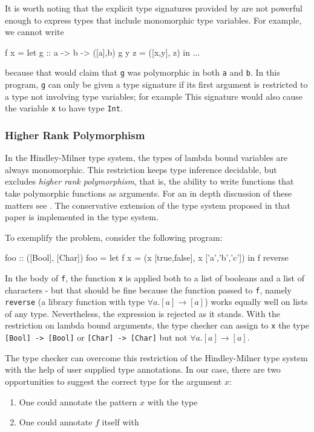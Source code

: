 It is worth noting that the explicit type signatures provided by \frege{} are not powerful enough to express types that include monomorphic type variables.
For example, we cannot write
\begin{code}
    f x = let
            g :: a -> b -> ([a],b)
            g y z = ([x,y], z)
        in ...
\end{code}
because that would claim that \texttt{g} was polymorphic in both \texttt{a} and \texttt{b}. In this program, \texttt{g} can only be given a type signature if its first argument is restricted to a type not involving type variables; for example 
This signature would also cause the variable \texttt{x} to have type \texttt{Int}.

\subsubsection{Higher Rank Polymorphism} \label{higher-rank}

In the Hindley-Milner type system, the types of lambda bound variables are always monomorphic. This restriction keeps type inference decidable, but excludes \emph{higher rank polymorphism}, that is, the ability to write functions that take polymorphic functions as arguments. For an in depth discussion of these matters see \cite{ptifart}. The conservative extension of the type system proposed in that paper is  implemented in the \frege{} type system.

To exemplify the problem, consider the following program:

\begin{code}
foo :: ([Bool], [Char])
foo = let
        f x = (x [true,false], x ['a','b','c'])
    in f reverse
\end{code}

In the body of \texttt{f}, the function \texttt{x} is applied both to a list of booleans and a list of characters - but that should be fine because the function passed to \texttt{f}, namely \texttt{reverse} (a library function with type $\forall{} a$.$[a] \rightarrow{} [a]$) works equally well on lists of any type. Nevertheless, the expression is rejected as it stands. With the restriction on lambda bound arguments, the type checker can assign to \texttt{x} the type \texttt{[Bool] -> [Bool]} or \texttt{[Char] -> [Char]} but not $\forall{} a$.$[a] \rightarrow{} [a]$.

The \frege{} type checker can overcome this restriction of the Hindley-Milner type system with the help of user supplied type annotations. In our case, there are two opportunities to suggest the correct type for the argument $x$:
\begin{enumerate}
\item One could annotate the pattern $x$ with the type 
\item One could annotate $f$ itself with 
\end{enumerate}


